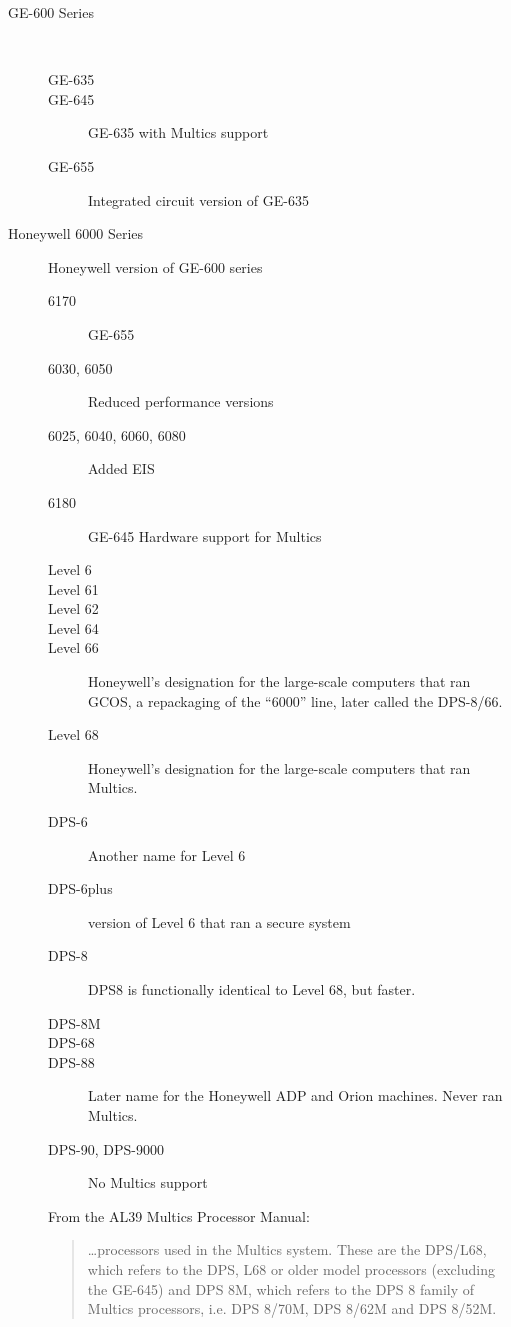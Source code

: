 \documentclass[notitlepage]{report}
\begin{document}
\begin{description}

    \item[GE-600 Series]  \hfill \\

    \begin{description}

        \item[GE-635]

        \item[GE-645] GE-635 with Multics support
        \item[GE-655] Integrated circuit version of GE-635

    \end{description}

    \item[Honeywell 6000 Series] Honeywell version of GE-600 series

    \begin{description}
        \item[6170] GE-655
        \item[6030, 6050] Reduced performance versions
        \item[6025, 6040, 6060, 6080] Added EIS
        \item[6180] GE-645  Hardware support for Multics
        \item[Level 6]
        \item[Level 61]
        \item[Level 62]
        \item[Level 64]
        \item[Level 66] Honeywell's designation for the large-scale computers that ran GCOS, a repackaging of the “6000” line, later called the DPS-8/66.
        \item[Level 68] Honeywell's designation for the large-scale computers that ran Multics.
        \item[DPS-6] Another name for Level 6
        \item[DPS-6plus] version of Level 6 that ran a secure system
        \item[DPS-8] DPS8 is functionally identical to Level 68, but faster.
        \item[DPS-8M]
        \item[DPS-68]
        \item[DPS-88] Later name for the Honeywell ADP and Orion machines. Never ran Multics.
        \item[DPS-90, DPS-9000] No Multics support
    \end{description}

From the AL39 Multics Processor Manual:

\begin {quote}

\ldots processors used in the Multics system. These are the DPS/L68, which
refers to the DPS, L68 or older model processors (excluding the GE-645) and 
DPS 8M, which refers to the DPS 8 family of Multics processors, i.e. DPS 8/70M, DPS 8/62M and DPS 8/52M.

\end {quote}
\end{description} %
\end{document}

